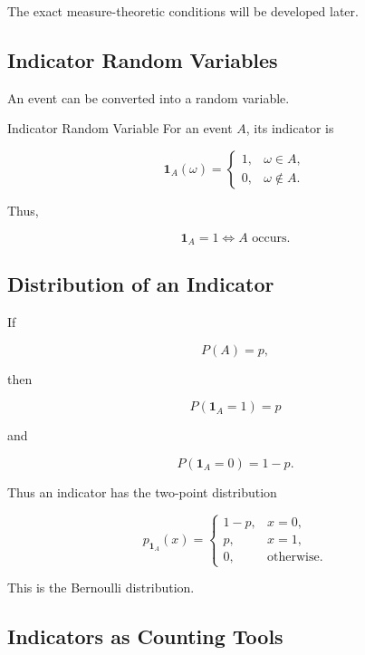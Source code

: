 The exact measure-theoretic conditions will be developed later.

\subsection{Indicator Random Variables}
\label{subsec:indicator-random-variables-probability}

An event can be converted into a random variable.

\begin{definitionbox}{Indicator Random Variable}
For an event \(A\), its indicator is

\[
\boxed{
\mathbf{1}_A(\omega)
=
\begin{cases}
1,&\omega\in A,\\
0,&\omega\notin A.
\end{cases}
}
\]
\end{definitionbox}

Thus,

\[
\boxed{
\mathbf{1}_A
=
1
\iff
A\text{ occurs}.
}
\]

\subsection{Distribution of an Indicator}
\label{subsec:indicator-distribution}

If

\[
P(A)=p,
\]

then

\[
P(\mathbf{1}_A=1)=p
\]

and

\[
P(\mathbf{1}_A=0)=1-p.
\]

Thus an indicator has the two-point distribution

\[
\boxed{
p_{\mathbf{1}_A}(x)
=
\begin{cases}
1-p,&x=0,\\
p,&x=1,\\
0,&\text{otherwise}.
\end{cases}
}
\]

This is the Bernoulli distribution.

\subsection{Indicators as Counting Tools}
\label{subsec:indicators-counting-tools}

